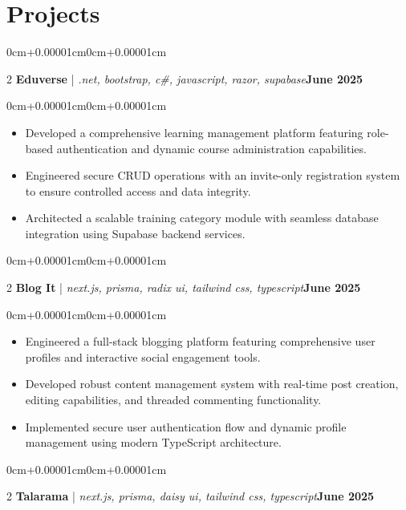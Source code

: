 \documentclass[10pt, letterpaper]{article}
\newenvironment{highlights}{\begin{itemize}[topsep=0.10cm,parsep=0.10cm,partopsep=0pt,itemsep=0pt,leftmargin=0cm+10pt]}{\end{itemize}}
\newenvironment{onecolentry}{\begin{adjustwidth}{0cm+0.00001cm}{0cm+0.00001cm}}{\end{adjustwidth}}
\newenvironment{twocolentry}[2][]{\onecolentry\def\secondColumn{#2}\setcolumnwidth{\fill,5cm}\begin{paracol}{2}}{\switchcolumn \raggedleft \secondColumn\end{paracol}\endonecolentry}
\begin{document}
\section{Projects}
    \begin{twocolentry}{\textbf{June 2025}}
        \textbf{Eduverse} | \textit{.net, bootstrap, c\#, javascript, razor, supabase}\end{twocolentry}
    \vspace{0.10cm}
    \begin{onecolentry}
        \begin{highlights}
            \item Developed a comprehensive learning management platform featuring role-based authentication and dynamic course administration capabilities.
            \item Engineered secure CRUD operations with an invite-only registration system to ensure controlled access and data integrity.
            \item Architected a scalable training category module with seamless database integration using Supabase backend services.
        \end{highlights}
    \end{onecolentry}
    \vspace{0.15cm}
    \begin{twocolentry}{\textbf{June 2025}}
        \textbf{Blog It} | \textit{next.js, prisma, radix ui, tailwind css, typescript}\end{twocolentry}
    \vspace{0.10cm}
    \begin{onecolentry}
        \begin{highlights}
            \item Engineered a full-stack blogging platform featuring comprehensive user profiles and interactive social engagement tools.
            \item Developed robust content management system with real-time post creation, editing capabilities, and threaded commenting functionality.
            \item Implemented secure user authentication flow and dynamic profile management using modern TypeScript architecture.
        \end{highlights}
    \end{onecolentry}
    \vspace{0.15cm}
    \begin{twocolentry}{\textbf{June 2025}}
        \textbf{Talarama} | \textit{next.js, prisma, daisy ui, tailwind css, typescript}\end{twocolentry}
\end{document}
